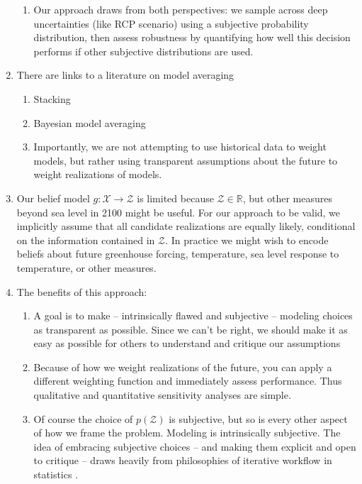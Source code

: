 \documentclass[12pt]{article}
\begin{document}
\begin{enumerate}
\begin{enumerate}
              \item Our approach draws from both perspectives: we sample across deep uncertainties (like RCP scenario) using a subjective probability distribution, then assess robustness by quantifying how well this decision performs if other subjective distributions are used.
          \end{enumerate}
    \item There are links to a literature on model averaging
          \begin{enumerate}
              \item Stacking \citep{Yao:2018bu}
              \item Bayesian model averaging \citep{massoud_bma:2020,bhat_bma:2011}
              \item Importantly, we are not attempting to use historical data to weight models, but rather using transparent assumptions about the future to weight realizations of models.
          \end{enumerate}
    \item Our belief model $g : \mathcal{X} \rightarrow \mathcal{Z}$ is limited because $\mathcal{Z} \in \mathbb{R}$, but other measures beyond sea level in 2100 might be useful. For our approach to be valid, we implicitly assume that all candidate realizations are equally likely, conditional on the information contained in $\mathcal{Z}$. In practice we might wish to encode beliefs about future greenhouse forcing, temperature, sea level response to temperature, or other measures.
    \item The benefits of this approach:
          \begin{enumerate}
              \item A goal is to make -- intrinsically flawed and subjective -- modeling choices as transparent as possible. Since we can't be right, we should make it as easy as possible for others to understand and critique our assumptions
              \item Because of how we weight realizations of the future, you can apply a different weighting function and immediately assess performance. Thus qualitative and quantitative sensitivity analyses are simple.
              \item Of course the choice of $p(\mathcal{Z})$ is subjective, but so is every other aspect of how we frame the problem. Modeling is intrinsically subjective. The idea of embracing subjective choices -- and making them explicit and open to critique -- draws heavily from philosophies of iterative workflow in statistics \citep{box:1976,gelman_workflow:2020,gelman_philosophy:2013}.

\end{enumerate}
\end{enumerate}
\end{document}
